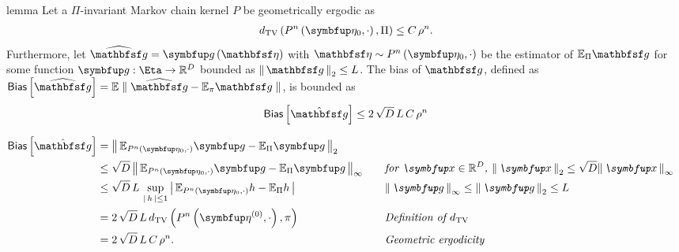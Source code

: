 \begin{theoremEnd}{lemma}\label{thm:mcmc_bias}
  Let a \(\Pi\)-invariant Markov chain kernel \(P\) be geometrically ergodic as
  \begin{align*}
    \DTV{P^{n}\left(\veta_0, \cdot\right)}{ \Pi } \leq C \, \rho^{n}.
  \end{align*}
  Furthermore, let \(\widehat{\rvvg} = \vg\left(\rvveta\right)\) with \(\rvveta \sim P^n\left(\veta_0, \cdot\right)\) be the estimator of \(\mathbb{E}_{\Pi}\rvvg\) for some function \(\vg : \Eta \rightarrow \mathbb{R}^{D}\) bounded as \( \norm{\rvvg}_{2} \leq L \).
  The bias of \(\rvvg\), defined as
  \(
    \mathsf{Bias}\left[ \widehat{\rvvg} \right] = \mathbb{E}\parallel \widehat{\rvvg} - \mathbb{E}_{\pi}\rvvg \parallel
  \),
  is bounded as
  \begin{alignat*}{2}
    \mathsf{Bias}\left[ \hat{\rvvg} \right]
    \leq
    2 \, \sqrt{D} \, L \, C \, \rho^{n}
  \end{alignat*}
\end{theoremEnd}
\begin{proofEnd}
  \begin{alignat}{2}
    \mathsf{Bias}\left[ \hat{\rvvg} \right]
    &=
    \norm{
      \mathbb{E}_{P^n\left(\veta_0, \cdot\right)}\vg
      -
      \mathbb{E}_{\Pi}\vg
    }_2
    \nonumber
    \\
    &\leq
    \sqrt{D}\,\norm{
      \mathbb{E}_{P^n\left(\veta_0, \cdot\right)}\vg
      -
      \mathbb{E}_{\Pi}\vg
    }_{\infty}
    &&\quad\text{\textit{for  \(\vx \in \mathbb{R}^D\), \(\norm{\vx}_2 \leq \sqrt{D}\norm{\vx}_{\infty}\)}}
    \nonumber
    \\
    &\leq
    \sqrt{D}\,L\,\sup_{\abs{h} \leq 1}
    \abs{
      \mathbb{E}_{P^n\left(\veta_0, \cdot\right)}h
      -
      \mathbb{E}_{\Pi}h
    }
    &&\quad\text{\textit{\(\norm{\vg}_{\infty} \leq \norm{\vg}_2 \leq L\)}}
    \nonumber
    \\
    &=
    2 \,  \sqrt{D} \, L \,
    \DTV{P^{n}\left(\veta^{(0)}, \cdot\right)}{\pi}
    &&\quad\text{\textit{Definition of \(d_{\mathrm{TV}}\)}}
    \nonumber
    \\
    &=
    2 \, \sqrt{D} \, L \, C \, \rho^{n}.
    &&\quad\text{\textit{Geometric ergodicity}}
    \nonumber
  \end{alignat}
\end{proofEnd}


